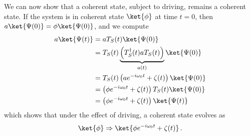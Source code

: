 We can now show that a coherent state, subject to driving, remains a coherent state.
If the system is in coherent state $\ket{\phi}$ at time $t=0$, then $a\ket{\Psi(0)} = \phi \ket{\Psi(0)}$, and we compute
\begin{align*}
  a \ket{\Psi(t)}
  &= a T_S(t) \ket{\Psi(0)} \\
  &= T_S(t) \underbrace{\left( T_S^\dagger(t) a T_S(t) \right)}_{a(t)} \ket{\Psi(0)} \\
  &= T_S(t) \left( a e^{-i \omega_0 t} + \zeta(t) \right) \ket{\Psi(0)} \\
  &= \left( \phi e^{-i \omega_0 t} + \zeta(t) \right) T_S(t) \ket{\Psi(0)} \\
  &= \left( \phi e^{-i \omega_0 t} + \zeta(t) \right) \ket{\Psi(t)} \\
\end{align*}
which shows that under the effect of driving, a coherent state evolves as
\begin{equation}
  \ket{\phi} \Rightarrow \ket{\phi e^{-i \omega_0 t} + \zeta(t)}
  \, .
\end{equation}



